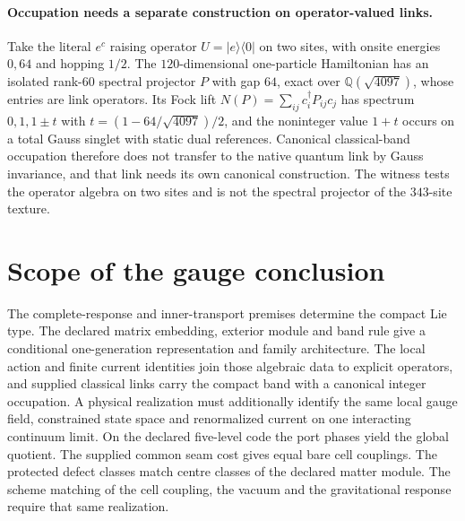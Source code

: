 \documentclass[11pt]{article}
\begin{document}
\paragraph{Occupation needs a separate construction on operator-valued links.}
Take the literal \(e^c\) raising operator \(U=|e\rangle\langle0|\) on two sites, with onsite
energies \(0,64\) and hopping \(1/2\). The \(120\)-dimensional one-particle Hamiltonian has an
isolated rank-\(60\) spectral projector \(P\) with gap \(64\), exact over
\(\mathbb Q(\sqrt{4097})\), whose entries are link operators. Its Fock lift
\(N(P)=\sum_{ij}c_i^\dagger P_{ij}c_j\) has spectrum \(0,1,1\pm t\) with
\(t=(1-64/\sqrt{4097})/2\), and the noninteger value \(1+t\) occurs on a total Gauss singlet
with static dual references. Canonical classical-band occupation therefore does not
transfer to the native quantum link by Gauss invariance, and that link needs its own
canonical construction. The witness tests the operator algebra on two sites and is not the
spectral projector of the \(343\)-site texture.

\section{Scope of the gauge conclusion}
The complete-response and inner-transport premises determine the compact
Lie type. The declared matrix embedding, exterior module and band rule give
a conditional one-generation representation and family architecture. The
local action and finite current identities join those algebraic data to
explicit operators, and supplied classical links carry the compact band with a
canonical integer occupation. A physical realization must additionally identify the
same local gauge field, constrained state space and renormalized current on
one interacting continuum limit. On the declared five-level code the port
phases yield the global quotient. The supplied common seam cost gives equal
bare cell couplings. The protected defect classes match centre classes of
the declared matter module. The scheme matching of the cell coupling, the vacuum and the
gravitational response require that same realization.

\def\OPHStandardModelDerivationPaper{1}
\end{document}
